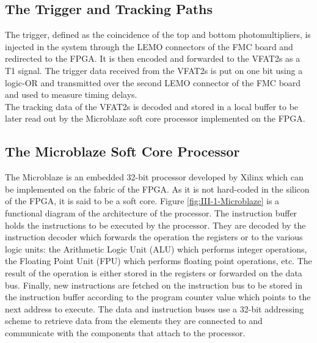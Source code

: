     \subsection{The Trigger and Tracking Paths}

      The trigger, defined as the coincidence of the top and bottom photomultipliers, is injected in the system through the LEMO connectors of the FMC board and redirected to the FPGA. It is then encoded and forwarded to the VFAT2s as a T1 signal. The trigger data received from the VFAT2s is put on one bit using a logic-OR and transmitted over the second LEMO connector of the FMC board and used to measure timing delays. \\

      The tracking data of the VFAT2s is decoded and stored in a local buffer to be later read out by the Microblaze soft core processor implemented on the FPGA.

    \subsection{The Microblaze Soft Core Processor}

      The Microblaze \cite{Microblaze} is an embedded 32-bit processor developed by Xilinx which can be implemented on the fabric of the FPGA. As it is not hard-coded in the silicon of the FPGA, it is said to be a soft core. Figure \ref{fig:III-1-Microblaze} is a functional diagram of the architecture of the processor. The instruction buffer holds the instructions to be executed by the processor. They are decoded by the instruction decoder which forwards the operation the registers or to the various logic units: the Arithmetic Logic Unit (ALU) which performs integer operations, the Floating Point Unit (FPU) which performs floating point operations, etc. The result of the operation is either stored in the registers or forwarded on the data bus. Finally, new instructions are fetched on the instruction bus to be stored in the instruction buffer according to the program counter value which points to the next address to execute. The data and instruction buses use a 32-bit addressing scheme to retrieve data from the elements they are connected to and communicate with the components that attach to the processor. \\

